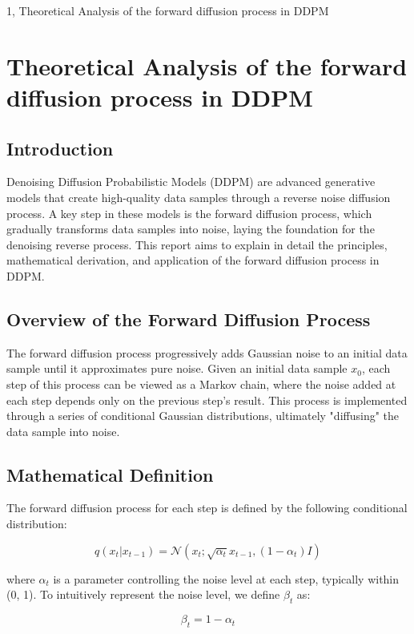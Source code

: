 \documentclass[10pt,a4paper]{article}
\begin{document}
\frontpage

\begin{task}{1,  Theoretical Analysis of the forward diffusion process in DDPM}
\section{Theoretical Analysis of the forward diffusion process in DDPM}
\subsection{Introduction}

Denoising Diffusion Probabilistic Models (DDPM) are advanced generative models that create high-quality data samples through a reverse noise diffusion process. A key step in these models is the forward diffusion process, which gradually transforms data samples into noise, laying the foundation for the denoising reverse process. This report aims to explain in detail the principles, mathematical derivation, and application of the forward diffusion process in DDPM.

\subsection{Overview of the Forward Diffusion Process}

The forward diffusion process progressively adds Gaussian noise to an initial data sample until it approximates pure noise. Given an initial data sample \( x_0 \), each step of this process can be viewed as a Markov chain, where the noise added at each step depends only on the previous step's result. This process is implemented through a series of conditional Gaussian distributions, ultimately "diffusing" the data sample into noise.

\subsection{Mathematical Definition}

The forward diffusion process for each step is defined by the following conditional distribution:

\[
q(x_t | x_{t-1}) = \mathcal{N}(x_t; \sqrt{\alpha_t} x_{t-1}, (1 - \alpha_t) I)
\]

where \(\alpha_t\) is a parameter controlling the noise level at each step, typically within (0, 1). To intuitively represent the noise level, we define \(\beta_t\) as:

\[
\beta_t = 1 - \alpha_t
\]


\end{task}
\end{document}
